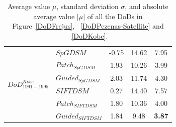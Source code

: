 \begin{table}
\begin{tabular}{||l|l|c|c|c||}
		\multirow{6}{*}{$DoD^{Kobe}_{1991-1995}$}
		&${{SpGDSM}}$ & -0.75 & 14.62 & 7.95\\
		&${Patch_{SpGDSM}}$ & 1.93 & 10.26 & 3.99\\
		&${Guided_{SpGDSM}}$ & 2.03 & 11.74 & 4.30\\
		&${{SIFTDSM}}$ & 0.27 & 14.40 & 7.57\\
		&${Patch_{SIFTDSM}}$ & 1.80 & 10.36 & 4.00\\
		&${Guided_{SIFTDSM}}$ & 1.84 & 9.48 & \textbf{3.87}\\\hline
		
		
	\end{tabular}
	\caption{Average value $\mu$, standard deviation $\sigma$, and absolute average value $|\mu|$ of all the \ac{DoD}s in Figure~\ref{DoDFrejus}, ~\ref{DoDPezenas-Satellite} and ~\ref{DoDKobe}.}
	\label{DoDStatistic}
\end{table}

